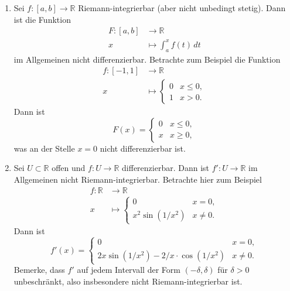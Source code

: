\documentclass[../main.tex]{subfiles}
\begin{document}
\begin{remarks}
  \leavevmode
  \begin{enumerate}[(1)]
    \item Sei $f \colon [a, b] \to \mathbb{R}$ Riemann-integrierbar
      (aber nicht unbedingt stetig). Dann ist die Funktion
      \begin{align*}
        F \colon [a, b] & \to \mathbb{R} \\
        x & \mapsto \int_{a}^{x} f(t) \, dt
      \end{align*}
      im Allgemeinen nicht differenzierbar.
      Betrachte zum Beispiel die Funktion
      \begin{align*}
        f \colon [-1, 1] & \to \mathbb{R} \\
        x & \mapsto
        \begin{cases}
          0 & x \leq 0,\\
          1 & x > 0.
        \end{cases}
      \end{align*}
      Dann ist
      \[
        F(x) =
        \begin{cases}
          0 & x \leq 0,\\
          x & x \geq 0,
        \end{cases}
      \]
      was an der Stelle $x = 0$ nicht differenzierbar ist.
    \item Sei $U \subset \mathbb{R}$ offen und
      $f \colon U \to \mathbb{R}$ differenzierbar.
      Dann ist $f' \colon U \to \mathbb{R}$ im Allgemeinen
      nicht Riemann-integrierbar.
      Betrachte hier zum Beispiel
      \begin{align*}
        f \colon \mathbb{R} & \to \mathbb{R} \\
        x & \mapsto
        \begin{cases}
          0 & x = 0, \\
          x^2 \sin(1/x^2) & x \neq 0.
        \end{cases}
      \end{align*}
      Dann ist
      \[
        f'(x) =
        \begin{cases}
          0 & x = 0,\\
          2x \sin(1/x^2) - 2/x \cdot \cos(1/x^2) & x \neq 0.
        \end{cases}
      \]
      Bemerke, dass $f'$ auf jedem Intervall
      der Form $(-\delta, \delta)$ für $\delta > 0$
      unbeschränkt, also insbesondere
      nicht Riemann-integrierbar ist.
  \end{enumerate}
\end{remarks}
\end{document}
